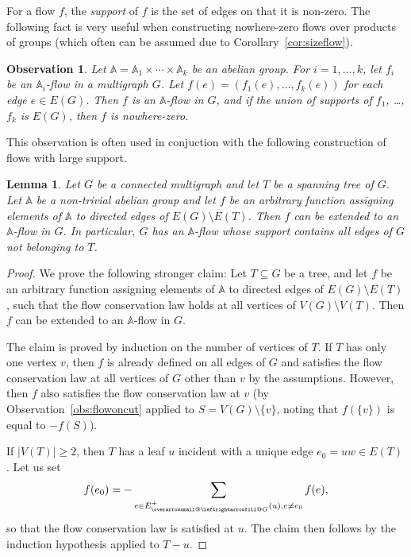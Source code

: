 \documentclass[12pt,twoside,openright,a4paper]{book}
\makeatletter
\newtheorem{lemma}[theorem]{Lemma}
\newtheorem{observation}[theorem]{Observation}
\newcommand{\ovlr}{\mathpalette{\overarrowsmall@\leftrightarrowfill@}}
\newcommand{\overarrowsmall@}[3]{%
  \vbox{%
    \ialign{%
      ##\crcr
      #1{\smaller@style{#2}}\crcr
      \noalign{\nointerlineskip}%
      $\m@th\hfil#2#3\hfil$\crcr
    }%
  }%
}
\def\smaller@style#1{%
  \ifx#1\displaystyle\scriptstyle\else
    \ifx#1\textstyle\scriptstyle\else
      \scriptscriptstyle
    \fi
  \fi
}
\makeatother
\begin{document}
For a flow $f$, the \emph{support} of $f$ is the set of edges on that it is non-zero.
The following fact is very useful when constructing nowhere-zero flows over products of groups (which often can be assumed due to Corollary~\ref{cor:sizeflow}).
\begin{observation}\label{obs:prodflow}
Let $\mathbb{A}=\mathbb{A}_1\times \cdots\times \mathbb{A}_k$ be an abelian group.
For $i=1,\ldots, k$, let $f_i$ be an $\mathbb{A}_i$-flow in a multigraph $G$.
Let $f(e)=(f_1(e),\ldots,f_k(e))$ for each edge $e\in E(G)$.  Then $f$ is an $\mathbb{A}$-flow in $G$,
and if the union of supports of $f_1$, \ldots, $f_k$ is $E(G)$, then $f$ is nowhere-zero.
\end{observation}

This observation is often used in conjuction with the following construction of flows with large support.

\begin{lemma}\label{lemma:treecomplflow}
Let $G$ be a connected multigraph and let $T$ be a spanning tree of $G$.  Let $\mathbb{A}$ be a non-trivial abelian group
and let $f$ be an arbitrary function assigning elements of $\mathbb{A}$ to directed edges of $E(G)\setminus E(T)$.
Then $f$ can be extended to an $\mathbb{A}$-flow in $G$.  In particular, $G$ has an $\mathbb{A}$-flow whose support
contains all edges of $G$ not belonging to $T$.
\end{lemma}
\begin{proof}
We prove the following stronger claim:  Let $T\subseteq G$ be a tree, and let $f$ be an arbitrary function assigning elements of
$\mathbb{A}$ to directed edges of $E(G)\setminus E(T)$, such that the flow conservation law holds at all vertices of $V(G)\setminus V(T)$.
Then $f$ can be extended to an $\mathbb{A}$-flow in $G$.

The claim is proved by induction on the number of vertices of $T$.  If $T$ has only one vertex $v$, then $f$ is already defined
on all edges of $G$ and satisfies the flow conservation law at all vertices of $G$ other than $v$ by the assumptions.
However, then $f$ also satisfies the flow conservation law at $v$ (by Observation~\ref{obs:flowoncut} applied to $S=V(G)\setminus\{v\}$,
noting that $f(\{v\})$ is equal to $-f(S)$).

If $|V(T)|\ge 2$, then $T$ has a leaf $u$ incident with a unique edge $e_0=uw\in E(T)$.  Let us set
$$f(e_0)=-\sum_{e\in E^+_{\ovlr{G}}(u), e\neq e_0} f(e),$$
so that the flow conservation law is satisfied at $u$.  The claim then follows by the induction hypothesis applied to $T-u$.
\end{proof}
\end{document}
